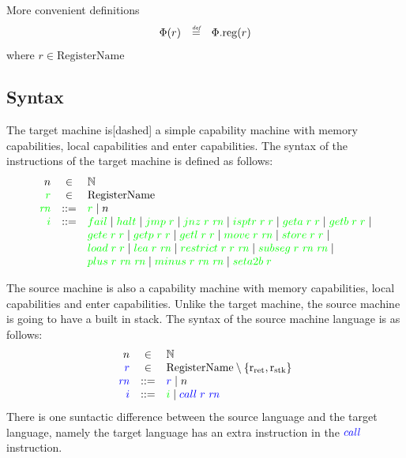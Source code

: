 \documentclass[a4paper]{article}
\newcommand{\defeq}{\stackrel{\textit{\tiny{def}}}{=}}
\newcommand{\sourcecolor}[1]{\color{blue}}
\newcommand{\src}[1]{{\sourcecolor{} #1}}
\newcommand{\targetcolor}[1]{\color{green}}
\newcommand{\trg}[1]{{\targetcolor{} #1}}
\newcommand{\zinstr}[1]{#1}
\newcommand{\oneinstr}[2]{
  \ifthenelse{\equal{#2}{}}
  {\zinstr{#1}}
  {\zinstr{#1} \; #2}
}
\newcommand{\twoinstr}[3]{
  \ifthenelse{\equal{#2#3}{}}
  {\zinstr{#1}}
  {\zinstr{#1} \; #2 \; #3}
}
\newcommand{\threeinstr}[4]{
  \ifthenelse{\equal{#2#3#4}{}}
  {\zinstr{#1}}
  {\zinstr{#1} \; #2 \; #3 \; #4}
}
\newcommand{\scall}[2]{\twoinstr{\src{call}}{#1}{#2}}
\newcommand{\tfail}{\zinstr{\trg{fail}}}
\newcommand{\thalt}{\zinstr{\trg{halt}}}
\newcommand{\tjmp}[1]{\oneinstr{\trg{jmp}}{#1}}
\newcommand{\tsetatob}[1]{\oneinstr{\trg{seta2b}}{#1}}
\newcommand{\tjnz}[2]{\twoinstr{\trg{jnz}}{#1}{#2}}
\newcommand{\tisptr}[2]{\twoinstr{\trg{isptr}}{#1}{#2}}
\newcommand{\tgeta}[2]{\twoinstr{\trg{geta}}{#1}{#2}}
\newcommand{\tgetb}[2]{\twoinstr{\trg{getb}}{#1}{#2}}
\newcommand{\tgete}[2]{\twoinstr{\trg{gete}}{#1}{#2}}
\newcommand{\tgetp}[2]{\twoinstr{\trg{getp}}{#1}{#2}}
\newcommand{\tgetl}[2]{\twoinstr{\trg{getl}}{#1}{#2}}
\newcommand{\tmove}[2]{\twoinstr{\trg{move}}{#1}{#2}}
\newcommand{\tstore}[2]{\twoinstr{\trg{store}}{#1}{#2}}
\newcommand{\tload}[2]{\twoinstr{\trg{load}}{#1}{#2}}
\newcommand{\tlea}[2]{\twoinstr{\trg{lea}}{#1}{#2}}
\newcommand{\trestrict}[3]{\threeinstr{\trg{restrict}}{#1}{#2}{#3}}
\newcommand{\tsubseg}[3]{\threeinstr{\trg{subseg}}{#1}{#2}{#3}}
\newcommand{\tplus}[3]{\threeinstr{\trg{plus}}{#1}{#2}{#3}}
\newcommand{\tminus}[3]{\threeinstr{\trg{minus}}{#1}{#2}{#3}}
\newcommand{\nats}{\mathbb{N}}
\newcommand{\sourcedom}[1]{\mathrm{#1}}
\newcommand{\sRegName}{\sourcedom{RegisterName}}
\newcommand{\sreg}{\sourcedom{reg}}
\newcommand{\targetdom}[1]{\mathrm{#1}}
\newcommand{\tRegName}{\targetdom{RegisterName}}
\newcommand{\var}[1]{\mathit{#1}}
\newcommand{\rn}{\var{rn}}
\newcommand{\rstk}{\mathrm{r}_\mathrm{stk}}
\newcommand{\rO}{\mathrm{r}_\mathrm{ret}}
\begin{document}
More convenient definitions
\[
  \begin{array}{rcl}
    \Phi(r) & \defeq & \Phi.\sreg(r)
  \end{array}
\]
where $r\in \sRegName$

\subsection{Syntax}
The target machine is[dashed] a simple capability machine with memory capabilities, local capabilities and enter capabilities. The syntax of the instructions of the target machine is defined as follows:
\[
\begin{array}{rcl}
n &\in & \nats \\
\trg{r} &\in &  \tRegName \\
\trg{\rn} &::= &  \trg{r} \mid n \\
\trg{i} &::= & \tfail \mid \thalt \mid \tjmp{\trg{r}} \mid \tjnz{\trg{r}}{\trg{\rn}} \mid \tisptr{\trg{r}}{\trg{r}} \mid \tgeta{\trg{r}}{\trg{r}} \mid \tgetb{\trg{r}}{\trg{r}} \mid \\
      & &  \tgete{\trg{r}}{\trg{r}}\mid \tgetp{\trg{r}}{\trg{r}} \mid \tgetl{\trg{r}}{\trg{r}} \mid \tmove{\trg{r}}{\trg{\rn}} \mid \tstore{\trg{r}}{\trg{r}} \mid\\
      & &  \tload{\trg{r}}{\trg{r}} \mid \tlea{\trg{r}}{\trg{\rn}} \mid \trestrict{\trg{r}}{\trg{r}}{\trg{\rn}} \mid \tsubseg{\trg{r}}{\trg{\rn}}{\trg{\rn}} \mid \\
      & & \tplus{\trg{r}}{\trg{\rn}}{\trg{\rn}} \mid \tminus{\trg{r}}{\trg{\rn}}{\trg{\rn}} \mid \tsetatob{\trg{r}}
\end{array}
\]

The source machine is also a capability machine with memory capabilities, local capabilities and enter capabilities. Unlike the target machine, the source machine is going to have a built in stack. The syntax of the source machine language is as follows:
\[
  \begin{array}{rcl}
    n & \in & \nats \\
    \src{r} &\in &  \sRegName \setminus \{\rO,\rstk\}\\
    \src{\rn} &::= & \src{r} \mid n \\
    \src{i} & ::= &  \trg{i} \mid \scall{\src{r}}{\src{\rn}}
  \end{array}
\]
There is one suntactic difference between the source language and the target language, namely the target language has an extra instruction in the $\scall{}{}$ instruction.
\end{document}
